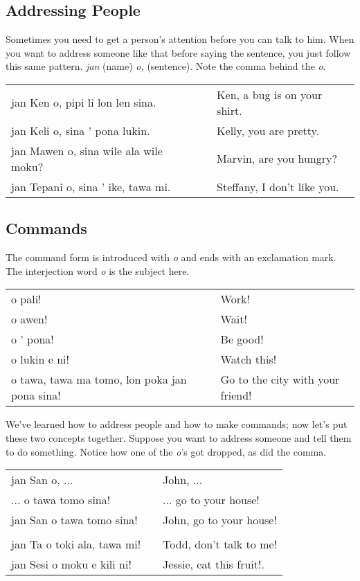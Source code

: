 \subsection*{Addressing People}
%
Sometimes you need to get a person's attention before you can talk to him. 
When you want to address someone like that before saying the sentence, you just follow this same pattern. 
\textit{jan} (name) \textit{o,} (sentence). 
Note the comma behind the \textit{o}. 

\begin{supertabular}{p{5,5cm}|ll}
jan Ken o, pipi li lon len sina. && Ken, a bug is on your shirt. \\
jan Keli o, sina ' pona lukin. && Kelly, you are pretty. \\
jan Mawen o, sina wile ala wile moku? && Marvin, are you hungry? \\
jan Tepani o, sina ' ike, tawa mi. && Steffany, I don't like you. \\
\end{supertabular} 
%
\subsection*{Commands}
%
The command form is introduced with \textit{o} and ends with an exclamation mark.
The interjection word \textit{o} is the subject here.

\begin{supertabular}{p{5,5cm}|ll}
o pali! && Work! \\
o awen! && Wait! \\
o ' pona! && Be good! \\
o lukin e ni! && Watch this! \\
o tawa, tawa ma tomo, lon poka jan pona sina! && Go to the city with your friend! \\
\end{supertabular} 

We've learned how to address people and how to make commands; now let's put these two concepts together. 
Suppose you want to address someone and tell them to do something. 
Notice how one of the \textit{o}'s got dropped, as did the comma. 

\begin{supertabular}{p{5,5cm}|ll}
jan San o, ...  && John, ... \\ %
 ... o tawa tomo sina! && ... go to your house! \\ %
jan San o tawa tomo sina!  && John, go to your house! \\
 && \\ %
jan Ta o toki ala, tawa mi! && Todd, don't talk to me! \\
jan Sesi o moku e kili ni! && Jessie, eat this fruit!. \\
\end{supertabular} 

